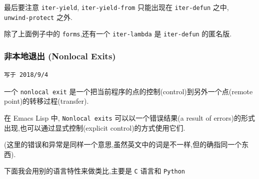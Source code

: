 \documentclass[11pt]{article}
\begin{document}
最后要注意 \texttt{iter-yield}, \texttt{iter-yield-from} 只能出现在 \texttt{iter-defun} 之中, \texttt{unwind-protect} 之外.

除了上面例子中的 \texttt{forms},还有一个 \texttt{iter-lambda} 是 \texttt{iter-defun} 的匿名版.



\subsubsection{非本地退出 (Nonlocal Exits)}
\label{sec:org905d736}

\begin{verbatim}
写于 2018/9/4
\end{verbatim}

一个 \texttt{nonlocal exit} 是一个把当前程序的点的控制(control)到另外一个点(remote point)的转移过程(transfer).

在 Emacs Lisp 中, \texttt{Nonlocal exits} 可以以一个错误结果(a result of errors)的形式出现,也可以通过显式控制(explicit control)的方式使用它们.

(这里的错误和异常是同样一个意思,虽然英文中的词是不一样,但的确指同一个东西).

下面我会用别的语言特性来做类比,主要是 \texttt{C} 语言和 \texttt{Python}
\end{document}
